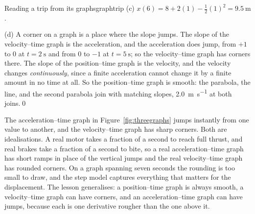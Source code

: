 \begin{example}{Reading a trip from its graphs}{graphtrip}
(c) $x(6) = 8 + 2(1) - \tfrac12(1)^2 = \SI{9.5}{\metre}$.

(d) A corner on a graph is a place where the slope jumps. The slope of the velocity--time graph is the acceleration, and the acceleration does jump, from $+1$ to $0$ at $t = \SI{2}{\second}$ and from $0$ to $-1$ at $t = \SI{5}{\second}$; so the velocity--time graph has corners there. The slope of the position--time graph is the velocity, and the velocity changes \emph{continuously}, since a finite acceleration cannot change it by a finite amount in no time at all. So the position--time graph is smooth: the parabola, the line, and the second parabola join with matching slopes, \SI{2.0}{\metre\per\second} at both joins.\qed
\end{example}

\begin{modelnote}
The acceleration--time graph in Figure~\ref{fig:threegraphs} jumps instantly from one value to another, and the velocity--time graph has sharp corners. Both are idealisations. A real motor takes a fraction of a second to reach full thrust, and real brakes take a fraction of a second to bite, so a real acceleration--time graph has short ramps in place of the vertical jumps and the real velocity--time graph has rounded corners. On a graph spanning seven seconds the rounding is too small to draw, and the step model captures everything that matters for the displacement. The lesson generalises: a position--time graph is always smooth, a velocity--time graph can have corners, and an acceleration--time graph can have jumps, because each is one derivative rougher than the one above it.
\end{modelnote}

